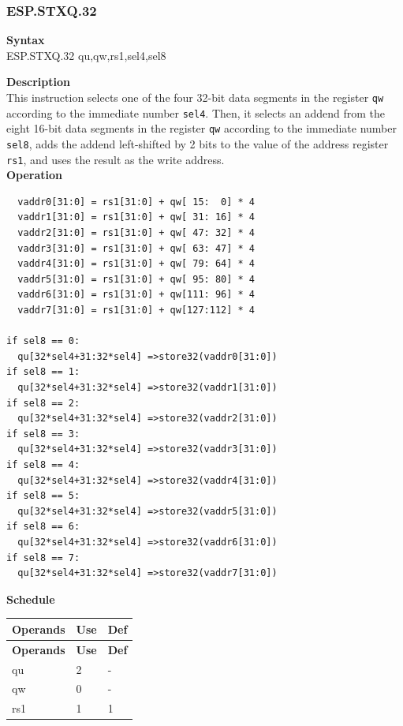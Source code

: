 \newpage
\subsubsection{ESP.STXQ.32}\label{instruction:ESPSTXQ32}
\textbf{Syntax}\\
ESP.STXQ.32 qu,qw,rs1,sel4,sel8

\textbf{Description}\\
This instruction selects one of the four 32-bit data segments in the register \lstinline{qw} according to the immediate number \lstinline{sel4}. Then, it selects an addend from the eight 16-bit data segments in the register \lstinline{qw} according to the immediate number \lstinline{sel8}, adds the addend left-shifted by 2 bits to the value of the address register \lstinline{rs1}, and uses the result as the write address.\\
\textbf{Operation}
\begin{lstlisting}
  vaddr0[31:0] = rs1[31:0] + qw[ 15:  0] * 4
  vaddr1[31:0] = rs1[31:0] + qw[ 31: 16] * 4
  vaddr2[31:0] = rs1[31:0] + qw[ 47: 32] * 4
  vaddr3[31:0] = rs1[31:0] + qw[ 63: 47] * 4
  vaddr4[31:0] = rs1[31:0] + qw[ 79: 64] * 4
  vaddr5[31:0] = rs1[31:0] + qw[ 95: 80] * 4
  vaddr6[31:0] = rs1[31:0] + qw[111: 96] * 4
  vaddr7[31:0] = rs1[31:0] + qw[127:112] * 4

if sel8 == 0:
  qu[32*sel4+31:32*sel4] =>store32(vaddr0[31:0])
if sel8 == 1:
  qu[32*sel4+31:32*sel4] =>store32(vaddr1[31:0])
if sel8 == 2:
  qu[32*sel4+31:32*sel4] =>store32(vaddr2[31:0])
if sel8 == 3:
  qu[32*sel4+31:32*sel4] =>store32(vaddr3[31:0])
if sel8 == 4:
  qu[32*sel4+31:32*sel4] =>store32(vaddr4[31:0])
if sel8 == 5:
  qu[32*sel4+31:32*sel4] =>store32(vaddr5[31:0])
if sel8 == 6:
  qu[32*sel4+31:32*sel4] =>store32(vaddr6[31:0])
if sel8 == 7:
  qu[32*sel4+31:32*sel4] =>store32(vaddr7[31:0])
\end{lstlisting}

\textbf{Schedule}\\
\begin{longtable}[c]{|l|l|l|}
    \hline
    \rowcolor{lightgray}
    \textbf{Operands} & \textbf{Use} & \textbf{Def} \\\hline
    \endfirsthead
    \hline
    \rowcolor{lightgray}
     \textbf{Operands} & \textbf{Use} & \textbf{Def} \\\hline
    \endhead
    \hline
    \endfoot

  qu & 2 & - \\\hline
  qw & 0 & - \\\hline
  rs1 & 1 & 1

\end{longtable}


